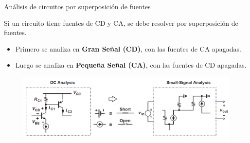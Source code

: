 \documentclass[t,aspectratio=169]{beamer}
\begin{document}
\begin{frame}{Análisis de circuitos por superposición de fuentes}

Si un circuito tiene fuentes de CD y CA, se debe resolver por superposición de fuentes.

\begin{itemize}
    \item Primero se analiza en \textbf{Gran Señal (CD)}, con las fuentes de CA apagadas.
    \item Luego se analiza en \textbf{Pequeña Señal (CA)}, con las fuentes de CD apagadas.
\end{itemize}

\begin{figure}
    \centering
    \includegraphics[width=\textwidth]{figuras/gran_senal_pequena_senal.png}
\end{figure}

\end{frame}
\end{document}
